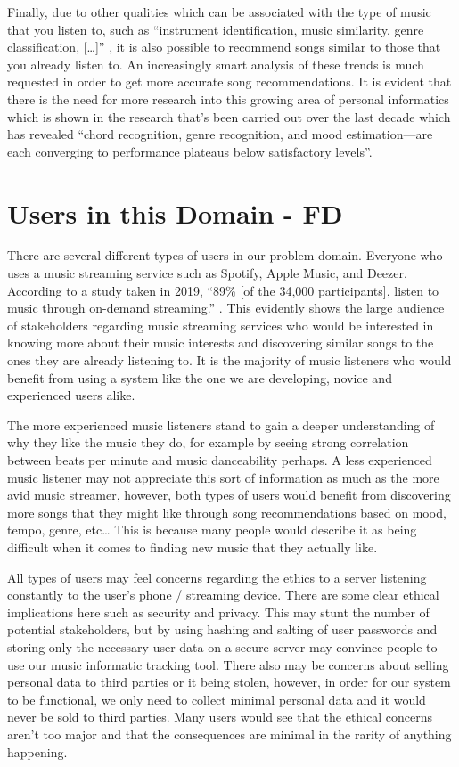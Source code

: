 \documentclass[10pt, notitlepage]{report}
\begin{document}
Finally, due to other qualities which can be associated with the type of music that you listen to, such as “instrument identification, music similarity, genre classification, […]” \cite{Humphrey2013}, it is also possible to recommend songs similar to those that you already listen to. An increasingly smart analysis of these trends is much requested in order to get more accurate song recommendations. It is evident that there is the need for more research into this growing area of personal informatics which is shown in the research that’s been carried out over the last decade which has revealed “chord recognition, genre recognition, and mood estimation—are each converging to performance plateaus below satisfactory levels”\cite{Humphrey2013}.

\section{Users in this Domain - FD}

There are several different types of users in our problem domain. Everyone who uses a music streaming service such as Spotify, Apple Music, and Deezer. According to a study taken in 2019, “89\% [of the 34,000 participants], listen to music through on-demand streaming.” \cite{IFPI2019}. This evidently shows the large audience of stakeholders regarding music streaming services who would be interested in knowing more about their music interests and discovering similar songs to the ones they are already listening to. It is the majority of music listeners who would benefit from using a system like the one we are developing, novice and experienced users alike.

The more experienced music listeners stand to gain a deeper understanding of why they like the music they do, for example by seeing strong correlation between beats per minute and music danceability perhaps. A less experienced music listener may not appreciate this sort of information as much as the more avid music streamer, however, both types of users would benefit from discovering more songs that they might like through song recommendations based on mood, tempo, genre, etc… This is because many people would describe it as being difficult when it comes to finding new music that they actually like.

All types of users may feel concerns regarding the ethics to a server listening constantly to the user’s phone / streaming device. There are some clear ethical implications here such as security and privacy. This may stunt the number of potential stakeholders, but by using hashing and salting of user passwords and storing only the necessary user data on a secure server may convince people to use our music informatic tracking tool. There also may be concerns about selling personal data to third parties or it being stolen, however, in order for our system to be functional, we only need to collect minimal personal data and it would never be sold to third parties. Many users would see that the ethical concerns aren’t too major and that the consequences are minimal in the rarity of anything happening.
\end{document}
